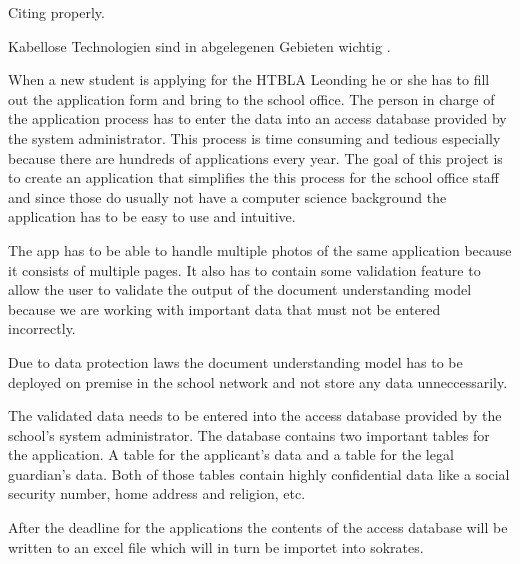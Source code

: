 Citing \cite{InfH} properly.

Kabellose Technologien sind in abgelegenen Gebieten wichtig \cite{APCW2006}.


When a new student is applying for the HTBLA Leonding he or she has to fill out the application form and bring to the school office.
The person in charge of the application process has to enter the data into an access database provided by the system administrator.
This process is time consuming and tedious especially because there are hundreds of applications every year.
The goal of this project is to create an application that simplifies the this process for the school office staff
and since those do usually not have a computer science background the application has to be easy to use and intuitive.

The app has to be able to handle multiple photos of the same application because it consists of multiple pages.
It also has to contain some validation feature to allow the user to validate the output of the document understanding model
because we are working with important data that must not be entered incorrectly.

Due to data protection laws the document understanding model has to be deployed on premise in the school network and not store
any data unneccessarily.

The validated data needs to be entered into the access database provided by the school's system administrator.
The database contains two important tables for the application.
A table for the applicant's data and a table for the legal guardian's data.
Both of those tables contain highly confidential data like a social security number, home address and religion, etc.

After the deadline for the applications the contents of the access database will be written to an excel file which will in turn be importet into \gls{sokrates}.
